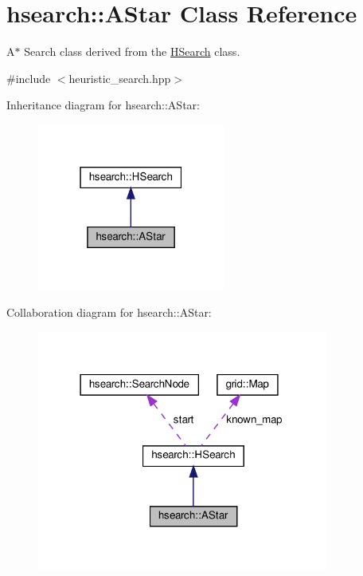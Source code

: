 \hypertarget{classhsearch_1_1AStar}{}\section{hsearch\+:\+:A\+Star Class Reference}
\label{classhsearch_1_1AStar}


A$\ast$ Search class derived from the \hyperlink{classhsearch_1_1HSearch}{H\+Search} class.  




{\ttfamily \#include $<$heuristic\+\_\+search.\+hpp$>$}



Inheritance diagram for hsearch\+:\+:A\+Star\+:\nopagebreak
\begin{figure}[H]
\begin{center}
\leavevmode
\includegraphics[width=175pt]{db/db4/classhsearch_1_1AStar__inherit__graph}
\end{center}
\end{figure}


Collaboration diagram for hsearch\+:\+:A\+Star\+:\nopagebreak
\begin{figure}[H]
\begin{center}
\leavevmode
\includegraphics[width=271pt]{d6/d18/classhsearch_1_1AStar__coll__graph}
\end{center}
\end{figure}

